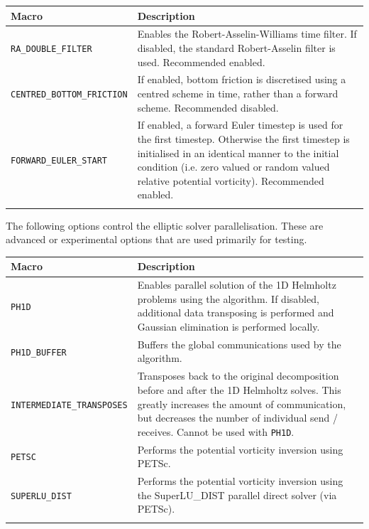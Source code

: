 \documentclass[a4paper]{book}
\begin{document}
\begin{longtable}{ | p{} | p{} | }
  \hline
  Macro & Description \\
  \hline
  \endhead
  \verb+RA_DOUBLE_FILTER+        & Enables the Robert-Asselin-Williams time filter.
                                   If disabled, the standard Robert-Asselin filter
                                   is used. Recommended enabled. \\
  \verb+CENTRED_BOTTOM_FRICTION+ & If enabled, bottom friction is discretised
                                   using a centred scheme in time, rather than
                                   a forward scheme. Recommended disabled. \\
  \verb+FORWARD_EULER_START+     & If enabled, a forward Euler timestep is
                                   used for the first timestep. Otherwise the
                                   first timestep is initialised in an identical
                                   manner to the initial condition (i.e. zero
                                   valued or random valued relative potential
                                   vorticity). Recommended enabled. \\

  \hline
  \endfoot
\end{longtable}

The following options control the elliptic solver parallelisation. These are
advanced or experimental options that are used primarily for testing.

\begin{longtable}{ | p{} | p{} | }
  \hline
  Macro & Description \\
  \hline
  \endhead
  \verb+PH1D+         & Enables parallel solution of the 1D Helmholtz problems
                        using the \citet{schumann1995} algorithm. If disabled,
                        additional data transposing is performed and Gaussian
                        elimination is performed locally. \\
  \verb+PH1D_BUFFER+  & Buffers the global communications used by the
                        \citet{schumann1995} algorithm. \\
  \verb+INTERMEDIATE_TRANSPOSES+ & Transposes back to the original decomposition
                                   before and after the 1D Helmholtz solves.
                                   This greatly increases the amount of
                                   communication, but decreases the number of
                                   individual send / receives. Cannot be used
                                   with \verb+PH1D+. \\
  \verb+PETSC+        & Performs the potential vorticity inversion using PETSc. \\
  \verb+SUPERLU_DIST+ & Performs the potential vorticity inversion using the
                        SuperLU\_DIST parallel direct solver (via PETSc). \\

  \hline
  \endfoot
\end{longtable}
\end{document}
